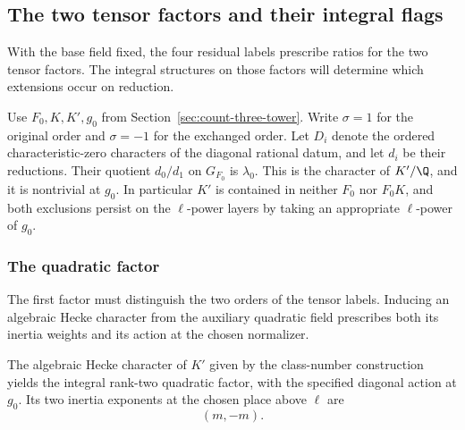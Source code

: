 \subsection{The two tensor factors and their integral flags}
\label{sec:count-three-tensor}

With the base field fixed, the four residual labels prescribe ratios for the two tensor factors. The integral structures on those factors will determine which extensions occur on reduction.

Use \(F_0,K,K',g_0\) from Section~\ref{sec:count-three-tower}.
Write \(\sigma=1\) for the original order and \(\sigma=-1\)
for the exchanged order. Let \(D_i\) denote the ordered
characteristic-zero characters of the diagonal rational datum,
and let \(d_i\) be their reductions. Their quotient
\(d_0/d_1\) on \(G_{F_0}\) is \(\lambda_0\).
This is the character of \(K'/\Q\), and it is nontrivial
at \(g_0\). In particular \(K'\) is contained in neither
\(F_0\) nor \(F_0K\), and both exclusions persist on the
\(\ell\)-power layers by taking an appropriate \(\ell\)-power of \(g_0\).

\subsubsection{The quadratic factor}

The first factor must distinguish the two orders of the tensor labels. Inducing an algebraic Hecke character from the auxiliary quadratic field prescribes both its inertia weights and its action at the chosen normalizer.

\begin{proposition}\label{prop:count-three-quadratic-factor}
The algebraic Hecke character of \(K'\) given by the
class-number construction yields the integral rank-two
quadratic factor, with the specified diagonal action at \(g_0\). Its two inertia exponents at the chosen place above \(\ell\) are 
\[
 (m,-m).
\]

\end{proposition}

